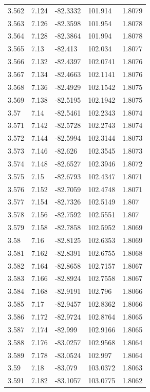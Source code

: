 \begin{tabular}{lllll}
3.562 & 7.124 & -82.3332 & 101.914 & 1.8079 \\
3.563 & 7.126 & -82.3598 & 101.954 & 1.8078 \\
3.564 & 7.128 & -82.3864 & 101.994 & 1.8078 \\
3.565 & 7.13 & -82.413 & 102.034 & 1.8077 \\
3.566 & 7.132 & -82.4397 & 102.0741 & 1.8076 \\
3.567 & 7.134 & -82.4663 & 102.1141 & 1.8076 \\
3.568 & 7.136 & -82.4929 & 102.1542 & 1.8075 \\
3.569 & 7.138 & -82.5195 & 102.1942 & 1.8075 \\
3.57 & 7.14 & -82.5461 & 102.2343 & 1.8074 \\
3.571 & 7.142 & -82.5728 & 102.2743 & 1.8074 \\
3.572 & 7.144 & -82.5994 & 102.3144 & 1.8073 \\
3.573 & 7.146 & -82.626 & 102.3545 & 1.8073 \\
3.574 & 7.148 & -82.6527 & 102.3946 & 1.8072 \\
3.575 & 7.15 & -82.6793 & 102.4347 & 1.8071 \\
3.576 & 7.152 & -82.7059 & 102.4748 & 1.8071 \\
3.577 & 7.154 & -82.7326 & 102.5149 & 1.807 \\
3.578 & 7.156 & -82.7592 & 102.5551 & 1.807 \\
3.579 & 7.158 & -82.7858 & 102.5952 & 1.8069 \\
3.58 & 7.16 & -82.8125 & 102.6353 & 1.8069 \\
3.581 & 7.162 & -82.8391 & 102.6755 & 1.8068 \\
3.582 & 7.164 & -82.8658 & 102.7157 & 1.8067 \\
3.583 & 7.166 & -82.8924 & 102.7558 & 1.8067 \\
3.584 & 7.168 & -82.9191 & 102.796 & 1.8066 \\
3.585 & 7.17 & -82.9457 & 102.8362 & 1.8066 \\
3.586 & 7.172 & -82.9724 & 102.8764 & 1.8065 \\
3.587 & 7.174 & -82.999 & 102.9166 & 1.8065 \\
3.588 & 7.176 & -83.0257 & 102.9568 & 1.8064 \\
3.589 & 7.178 & -83.0524 & 102.997 & 1.8064 \\
3.59 & 7.18 & -83.079 & 103.0372 & 1.8063 \\
3.591 & 7.182 & -83.1057 & 103.0775 & 1.8062 \\

\end{tabular}

